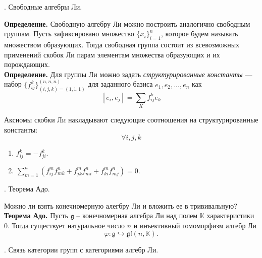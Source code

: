 \documentclass[
 aps, pra,
 amsmath,amssymb,
 11pt,
 final,
tightenlines,
 twoside,
 twocolumn,
 nofloats,
nofootinbib,
 superscriptaddress,
showkeys,
showkeywords,
 ]
{revtex4-2}
\begin{document}
{\hrulefill

\begin{center}
{. Свободные алгебры Ли.}
\end{center}

{ \bf Определение. } Свободную алгебру Ли можно построить аналогично свободным группам. Пусть зафиксировано множество $\{x_i\}^n_{i=1}$, которое будем называть множеством образующих. Тогда свободная группа состоит из всевозможных применений скобок Ли парам элементам множества образующих и их порождающих.\\


{ \bf Определение. } Для группы Ли можно задать { \it структурированные константы} --- набор $\{f^k_{ij}\}^{(n, n, n)}_{(i, j, k) = (1, 1, 1)}$ для заданного базиса ${e_1, e_2, ..., e_n}$ как
$$
[e_i, e_j] = \sum_K f^k_{ij}e_k
$$

Аксиомы скобки Ли накладывают следующие соотношения на структурированные константы: $$\forall i,j,k$$
\begin{enumerate}
\item 
$
f_{ij}^k = -f_{ji}^k .
$

\item
$
\displaystyle\sum_{m=1}^n \left( f_{ij}^m f_{mk}^n + f_{jk}^m f_{mi}^n + f_{ki}^m f_{mj}^n \right) = 0.
$
\end{enumerate}


\hrulefill

\begin{center}
{. Теорема Адо.}
\end{center}

Можно ли взять конечномерную алегбру Ли и вложить ее в трививальную?\\

{ \bf Теорема Адо. } Пусть $\mathfrak{g}$ -- конечномерная алгебра Ли над полем $\mathbb{K}$ характеристики 0. Тогда существует натуральное число $n$ и инъективный гомоморфизм алгебр Ли
\[
\varphi: \mathfrak{g} \hookrightarrow \mathfrak{gl}(n,\mathbb{K}).
\]




\hrulefill

\begin{center}
{. Связь категории групп с категориями алгебр Ли.}
\end{center}

}
\end{document}
